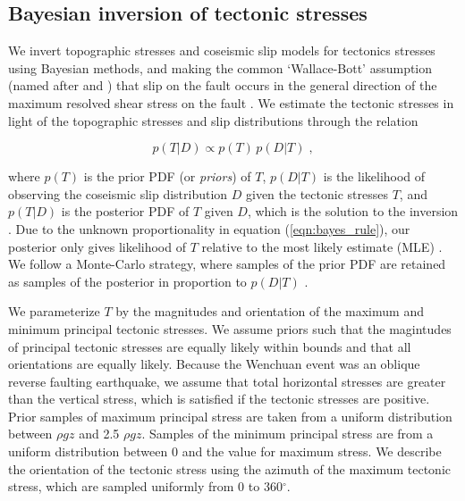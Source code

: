 \documentclass[twocolumn,jgrga]{AGUTeX}
\begin{document}
\begin{article}
\subsection{Bayesian inversion of tectonic
stresses}\label{bayesian-inversion-of-tectonic-stresses}

We invert topographic stresses and coseismic slip models for tectonics
stresses using Bayesian methods, and making the common `Wallace-Bott'
assumption (named after \citet{wallace1951} and \citet{bott1959}) 
that slip on the fault occurs in the general direction
of the maximum resolved shear stress on the fault \citep[e.g.,][]
{mckenzie1969, angelier1994}. We estimate the tectonic stresses in
light of the topographic stresses and slip distributions through the
relation

\begin{equation} 
p(T|D) \propto p(T) \, p(D|T) \; , 
\label{eqn:bayes_rule} 
\end{equation}

where $p(T)$ is the prior PDF (or \emph{priors}) of $T$, $p(D|T)$ is the
likelihood of observing the coseismic slip distribution $D$ given the
tectonic stresses $T$, and $p(T|D)$ is the posterior PDF of $T$ given
$D$, which is the solution to the inversion \citep[e.g.,][]{mosegaard1995}.
Due to the unknown proportionality in equation (\ref{eqn:bayes_rule}),
our posterior only gives likelihood of $T$ relative to the most likely
estimate (MLE) \citep{tarantola2005}. We follow a Monte-Carlo strategy,
where samples of the prior PDF are retained as samples of the posterior
in proportion to $p(D|T)$ \citep[e.g.,][]{mosegaard1995}.

We parameterize $T$ by the magnitudes and orientation of the maximum and
minimum principal tectonic stresses. We assume priors such that the
magintudes of principal tectonic stresses are equally likely within
bounds and that all orientations are equally likely. Because the
Wenchuan event was an oblique reverse faulting earthquake, we assume
that total horizontal stresses are greater than the vertical stress,
which is satisfied if the tectonic stresses are positive. Prior samples
of maximum principal stress are taken from a uniform distribution
between $\rho g z$ and 2.5 $\rho g z$. Samples of the minimum principal
stress are from a uniform distribution between 0 and the value for
maximum stress. We describe the orientation of the tectonic stress using
the azimuth of the maximum tectonic stress, which are sampled uniformly
from 0 to 360$^{\circ}$.


\end{article}
\end{document}
